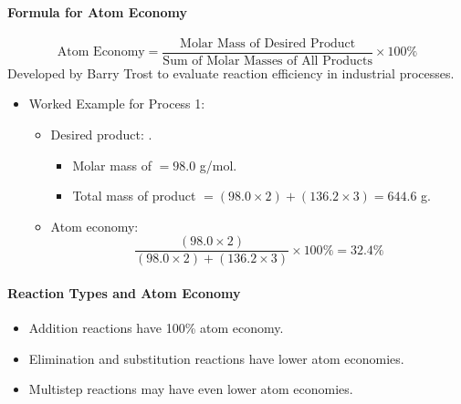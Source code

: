 \paragraph{Formula for Atom Economy}
\begin{equation}
    \text{Atom Economy} = \frac{\text{Molar Mass of Desired Product}}{\text{Sum of Molar Masses of All Products}} \times 100\%
\end{equation}
Developed by Barry Trost to evaluate reaction efficiency in industrial processes.
\begin{itemize}
    \item Worked Example for Process 1:
    \begin{itemize}
        \item Desired product: .
        \begin{itemize}
            \item Molar mass of  $= 98.0$ g/mol.
            \item Total mass of product $= \left(98.0 \times 2\right) + \left(136.2 \times 3\right) = 644.6$ g.
        \end{itemize}
        \item Atom economy:
        \begin{equation}
            \frac{\left(98.0 \times 2\right)}{\left(98.0 \times 2\right) + \left(136.2 \times 3\right)} \times 100\% = 32.4\%
        \end{equation}
    \end{itemize}
\end{itemize}

\paragraph{Reaction Types and Atom Economy}
\begin{itemize}
    \item Addition reactions have 100\% atom economy.
    \item Elimination and substitution reactions have lower atom economies.
    \item Multistep reactions may have even lower atom economies.
\end{itemize}